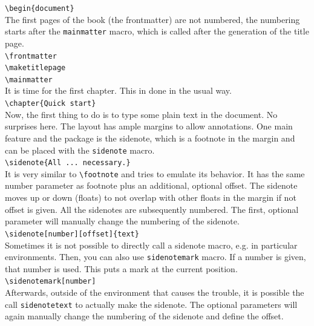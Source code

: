 \documentclass{caesar_book}
\begin{document}
\verb+\begin{document}+\\
The first pages of the book (the frontmatter) are not numbered, the numbering starts after the \texttt{mainmatter} macro, which is called after the generation of the title page.\\
\verb+\frontmatter+\\
\verb+\maketitlepage+\\
\verb+\mainmatter+\\
It is time for the first chapter. This in done in the usual way.\\
\verb+\chapter{Quick start}+\\
Now, the first thing to do is to type some plain text in the document. No surprises here.
The layout has ample margins to allow annotations. 
One main feature and the package is the sidenote, which is a footnote in the margin and can be placed with the \texttt{sidenote} macro.\\
\verb+\sidenote{All ... necessary.}+\\
It is very similar to \verb+\footnote+ and tries to emulate its behavior. It has the same number parameter as footnote plus an additional, optional offset. The sidenote moves up or down (floats) to not overlap with other floats in the margin if not offset is given. All the sidenotes are subsequently numbered. The first, optional parameter will manually change the numbering of the sidenote.\\
\verb+\sidenote[number][offset]{text}+\\
Sometimes it is not possible to directly call a sidenote macro, e.g. in particular environments. Then, you can also use \texttt{sidenotemark} macro. If a number is given, that number is used. This puts a mark at the current position.\\
\verb+\sidenotemark[number]+\\
Afterwards, outside of the environment that causes the trouble, it is possible the call \texttt{sidenotetext} to actually make the sidenote. The optional parameters will again manually change the numbering of the sidenote and define the offset.\\
\end{document}
